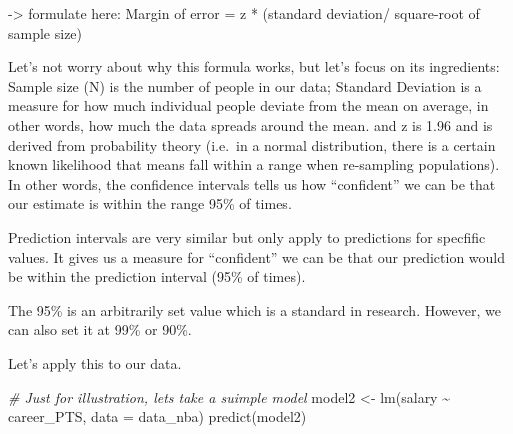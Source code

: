 \documentclass[
]{book}
\newenvironment{Shaded}{\begin{snugshade}}{\end{snugshade}}
\newcommand{\AttributeTok}[1]{\textcolor[rgb]{0.77,0.63,0.00}{#1}}
\newcommand{\CommentTok}[1]{\textcolor[rgb]{0.56,0.35,0.01}{\textit{#1}}}
\newcommand{\FunctionTok}[1]{\textcolor[rgb]{0.00,0.00,0.00}{#1}}
\newcommand{\NormalTok}[1]{#1}
\newcommand{\OtherTok}[1]{\textcolor[rgb]{0.56,0.35,0.01}{#1}}
\newcommand{\SpecialCharTok}[1]{\textcolor[rgb]{0.00,0.00,0.00}{#1}}
\begin{document}
-\textgreater{} formulate here: Margin of error = z * (standard deviation/ square-root of sample size)

Let's not worry about why this formula works, but let's focus on its ingredients: Sample size (N) is the number of people in our data; Standard Deviation is a measure for how much individual people deviate from the mean on average, in other words, how much the data spreads around the mean. and z is 1.96 and is derived from probability theory (i.e.~in a normal distribution, there is a certain known likelihood that means fall within a range when re-sampling populations). In other words, the confidence intervals tells us how ``confident'' we can be that our estimate is within the range 95\% of times.

Prediction intervals are very similar but only apply to predictions for specfific values. It gives us a measure for ``confident'' we can be that our prediction would be within the prediction interval (95\% of times).

The 95\% is an arbitrarily set value which is a standard in research. However, we can also set it at 99\% or 90\%.

Let's apply this to our data.

\begin{Shaded}
\begin{Highlighting}[]
\CommentTok{\# Just for illustration, let\textquotesingle{}s take a suimple model}
\NormalTok{model2 }\OtherTok{\textless{}{-}} \FunctionTok{lm}\NormalTok{(salary }\SpecialCharTok{\textasciitilde{}}\NormalTok{ career\_PTS, }\AttributeTok{data =}\NormalTok{ data\_nba)}
\FunctionTok{predict}\NormalTok{(model2)}
\end{Highlighting}
\end{Shaded}
\end{document}
